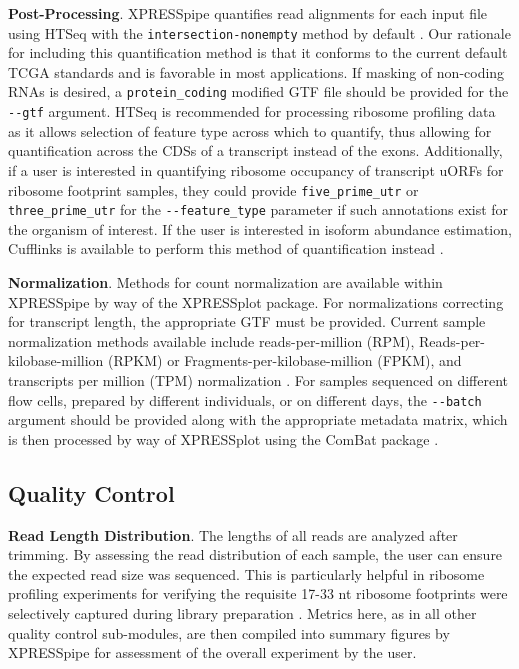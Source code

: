 \documentclass[10pt, oneside]{article}
\begin{document}
\begin{multicols}{2}
\noindent\textbf{Post-Processing}. XPRESSpipe quantifies read alignments for each input file using HTSeq with the \texttt{intersection-nonempty} method by default \cite{htseq, count_benchmark}. Our rationale for including this quantification method is that it conforms to the current default TCGA standards and is favorable in most applications. If masking of non-coding RNAs is desired, a \texttt{protein\_coding} modified GTF file should be provided for the \texttt{-{}-gtf} argument. HTSeq is recommended for processing ribosome profiling data as it allows selection of feature type across which to quantify, thus allowing for quantification across the CDSs of a transcript instead of the exons. Additionally, if a user is interested in quantifying ribosome occupancy of transcript uORFs for ribosome footprint samples, they could provide \texttt{five\_prime\_utr} or \texttt{three\_prime\_utr} for the \texttt{-{}-feature\_type} parameter if such annotations exist for the organism of interest. If the user is interested in isoform abundance estimation, Cufflinks is available to perform this method of quantification instead \cite{cufflinks, count_benchmark}. \par

\noindent\textbf{Normalization}. Methods for count normalization are available within XPRESSpipe by way of the XPRESSplot package. For normalizations correcting for transcript length, the appropriate GTF must be provided. Current sample normalization methods available include reads-per-million (RPM), Reads-per-kilobase-million (RPKM) or Fragments-per-kilobase-million (FPKM), and transcripts per million (TPM) normalization \cite{evans_briefbio}. For samples sequenced on different flow cells, prepared by different individuals, or on different days, the \texttt{-{}-batch} argument should be provided along with the appropriate metadata matrix, which is then processed by way of XPRESSplot using the ComBat package \cite{sva}. \par

\subsection*{Quality Control}
\textbf{Read Length Distribution}. The lengths of all reads are analyzed after trimming. By assessing the read distribution of each sample, the user can ensure the expected read size was sequenced. This is particularly helpful in ribosome profiling experiments for verifying the requisite 17-33 nt ribosome footprints were selectively captured during library preparation \cite{ingolia_meth, fp_range}. Metrics here, as in all other quality control sub-modules, are then compiled into summary figures by XPRESSpipe for assessment of the overall experiment by the user. \par


\end{multicols}
\end{document}
